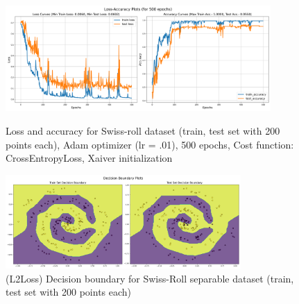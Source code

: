 \begin{solve}
\begin{figure}[H]
    \centering
    \includegraphics[width=0.9\textwidth]{plots/6_spiral_adam_more_layersloss_acc.png}
    \caption{Loss and accuracy for Swiss-roll dataset (train, test set with 200 points each), Adam optimizer (lr = .01), 500 epochs, Cost function: CrossEntropyLoss, Xaiver initialization}
    \includegraphics[width=0.8\textwidth]{plots/6_spiral_adam_more_layersboundary.png}
    \caption{(L2Loss) Decision boundary for Swiss-Roll separable dataset (train, test set with 200 points each)}
\end{figure}


\end{solve}
